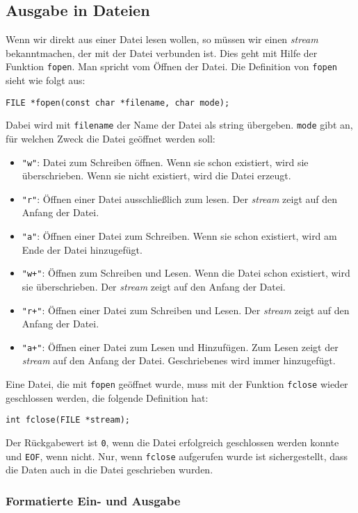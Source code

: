 \subsection{Ausgabe in Dateien}

Wenn wir direkt aus einer Datei lesen wollen, so müssen wir einen \emph{stream} bekanntmachen, der mit der Datei verbunden ist.
Dies geht mit Hilfe der Funktion \verb|fopen|.
Man spricht vom Öffnen der Datei.
Die Definition von \texttt{fopen} sieht wie folgt aus:
\begin{lstlisting}
FILE *fopen(const char *filename, char mode);
\end{lstlisting}
Dabei wird mit \texttt{filename} der Name der Datei als string übergeben.
\texttt{mode} gibt an, für welchen Zweck die Datei geöffnet werden soll:
\begin{itemize} 
  \itemsep0.5ex
\item \texttt{"w"}: Datei zum Schreiben öffnen. Wenn sie schon existiert, wird sie überschrieben. Wenn sie nicht existiert, wird die Datei erzeugt.
\item \texttt{"r"}: Öffnen einer Datei ausschließlich zum lesen. Der \emph{stream} zeigt auf den Anfang der Datei.
\item \texttt{"{}a"}: Öffnen einer Datei zum Schreiben. Wenn sie schon existiert, wird am Ende der Datei hinzugefügt.
\item \texttt{"w+"}: Öffnen zum Schreiben und Lesen. Wenn die Datei schon existiert, wird sie überschrieben. Der \emph{stream} zeigt auf den Anfang der Datei.
\item \texttt{"r+"}: Öffnen einer Datei zum Schreiben und Lesen. Der \emph{stream} zeigt auf den Anfang der Datei.
\item \texttt{"{}a+"}: Öffnen einer Datei zum Lesen und Hinzufügen. Zum Lesen zeigt der \emph{stream} auf den Anfang der Datei. Geschriebenes wird immer hinzugefügt.
\end{itemize}
Eine Datei, die mit \texttt{fopen} geöffnet wurde, muss mit der Funktion \texttt{fclose} wieder geschlossen werden, die folgende Definition hat:
\begin{lstlisting}
int fclose(FILE *stream);
\end{lstlisting}
Der Rückgabewert ist \texttt{0}, wenn die Datei erfolgreich geschlossen werden konnte und \texttt{EOF}, wenn nicht.
Nur, wenn \texttt{fclose} aufgerufen wurde ist sichergestellt, dass die Daten auch in die Datei geschrieben wurden.

\subsubsection{Formatierte Ein- und Ausgabe} \label{subsec:FormattedInAndOutput}

